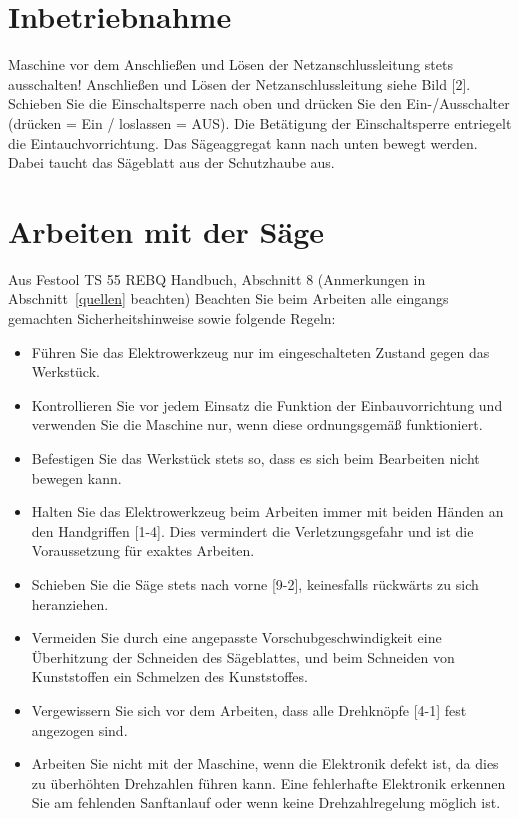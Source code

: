 \documentclass{\basedir/fablab-document}
\begin{document}
\section{Inbetriebnahme}
Maschine vor dem Anschließen und Lösen der Netzanschlussleitung stets ausschalten! Anschließen und Lösen der Netzanschlussleitung siehe Bild [2].
Schieben Sie die Einschaltsperre nach oben und drücken Sie den Ein-/Ausschalter (drücken = Ein / loslassen = AUS).
Die Betätigung der Einschaltsperre entriegelt die Eintauchvorrichtung. Das Sägeaggregat kann nach unten bewegt werden. Dabei taucht das Sägeblatt aus der Schutzhaube aus.

\section{Arbeiten mit der Säge}
\begin{leftbar}{Aus Festool TS 55 REBQ Handbuch, Abschnitt 8 (Anmerkungen in Abschnitt~\ref{quellen} beachten)}
Beachten Sie beim Arbeiten alle eingangs gemachten Sicherheitshinweise
sowie folgende Regeln:
\begin{itemize}
\item Führen Sie das Elektrowerkzeug nur im
eingeschalteten Zustand gegen das Werkstück.
\item Kontrollieren Sie vor jedem Einsatz die
Funktion der Einbauvorrichtung und verwenden Sie die Maschine nur, wenn diese
ordnungsgemäß funktioniert.
\item Befestigen Sie das Werkstück stets so,
dass es sich beim Bearbeiten nicht bewegen kann.
\item Halten Sie das Elektrowerkzeug beim Arbeiten immer mit beiden Händen an den
Handgriffen [1-4]. Dies vermindert die Verletzungsgefahr und ist die Voraussetzung
für exaktes Arbeiten.
\item Schieben Sie die Säge stets nach vorne [9-2], keinesfalls rückwärts zu sich heranziehen.
\item Vermeiden Sie durch eine angepasste Vorschubgeschwindigkeit eine Überhitzung
der Schneiden des Sägeblattes, und beim
Schneiden von Kunststoffen ein Schmelzen
des Kunststoffes.
\item Vergewissern Sie sich vor dem Arbeiten,
dass alle Drehknöpfe [4-1] fest angezogen
sind.
\item Arbeiten Sie nicht mit der Maschine, wenn
die Elektronik defekt ist, da dies zu überhöhten Drehzahlen führen kann. Eine fehlerhafte Elektronik erkennen Sie am fehlenden Sanftanlauf oder wenn keine Drehzahlregelung möglich ist.
\end{itemize}
\end{leftbar}
\end{document}
